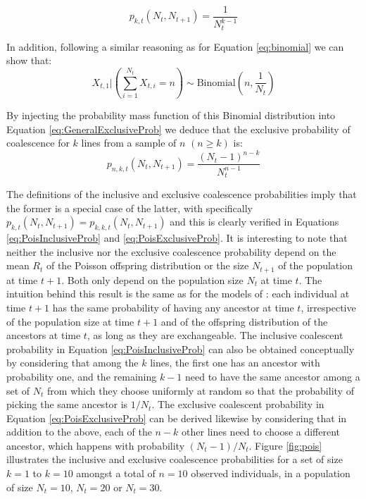 \documentclass{article}
\renewcommand{\eqref}[1]{\ref{#1}}
\begin{document}
\begin{equation}
	p_{k,t}(N_t, N_{t+1})=\frac{1}{N_t^{k-1}}\label{eq:PoisInclusiveProb}
\end{equation}

In addition, following a similar reasoning as for Equation \eqref{eq:binomial} we can show that:
\begin{equation}
X_{t,1} \bigg| \left(\sum_{i=1}^{N_t} X_{t,i} = n\right) \sim \text{Binomial}\left(n, \frac{1}{N_t}\right)
\end{equation}

By injecting the probability mass function of this Binomial distribution 
into Equation \eqref{eq:GeneralExclusiveProb} we deduce that 
the exclusive probability of coalescence for $k$ lines from a sample of $n$ $(n \geq k)$ is:
	\begin{equation}
		p_{n,k,t}(N_t, N_{t+1}) = \frac{(N_t-1)^{n-k}}{N_t^{n-1}}\label{eq:PoisExclusiveProb}
	\end{equation}

The definitions of the inclusive and exclusive coalescence probabilities imply that the former
is a special case of the latter, with specifically $p_{k,t}(N_t, N_{t+1})=p_{k,k,t}(N_t, N_{t+1})$
and this is clearly verified in Equations \eqref{eq:PoisInclusiveProb} and  \eqref{eq:PoisExclusiveProb}.	
It is interesting to note that neither the inclusive nor the exclusive coalescence probability
depend on the mean $R_t$ of the Poisson offspring distribution or the size $N_{t+1}$
of the population at time $t+1$. Both only depend on the population size $N_t$ at time $t$.
The intuition behind this result is the same as for the models of \citet{Cannings1974}:
each individual at time $t+1$ has the same probability of having any ancestor at time $t$,
irrespective of the population size at time $t+1$ and of the offspring distribution of the ancestors at time $t$,
as long as they are exchangeable.
The inclusive coalescent probability in Equation \eqref{eq:PoisInclusiveProb}
can also be obtained conceptually by considering
that among the $k$ lines, the first one has an ancestor with probability one, 
and the remaining $k-1$ need to have the same ancestor among a set of $N_t$ from
which they choose uniformly at random so that the probability of picking the same ancestor
is $1/N_t$. The exclusive coalescent probability in Equation \eqref{eq:PoisExclusiveProb} 
can be derived likewise by considering
that in addition to the above, each of the $n-k$ other lines need to choose a different
ancestor, which happens with probability $(N_t-1)/N_t$.
Figure \ref{fig:pois} illustrates the inclusive and exclusive coalescence probabilities 
for a set of size $k=1$ to $k=10$ amongst a total of $n=10$ observed
individuals, in a population of size $N_t=10$, $N_t=20$ or $N_t=30$. 
\end{document}
